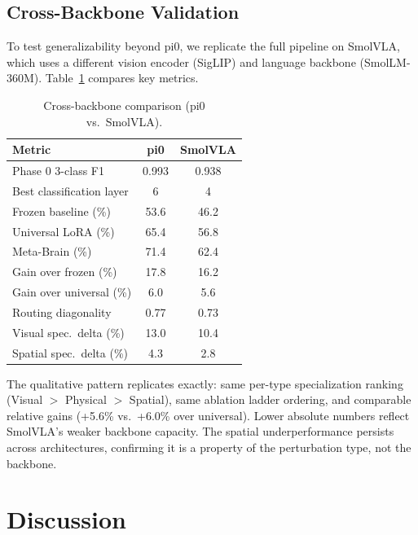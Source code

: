 \documentclass[letterpaper]{article}
\begin{document}
\subsection{Cross-Backbone Validation}

To test generalizability beyond pi0, we replicate the full pipeline on SmolVLA, which uses a different vision encoder (SigLIP) and language backbone (SmolLM-360M).
Table~\ref{tab:cross-backbone} compares key metrics.

\begin{table}[h]
\centering
\caption{Cross-backbone comparison (pi0 vs.\ SmolVLA).}
\label{tab:cross-backbone}
\small
\begin{tabular}{lcc}
\toprule
Metric & pi0 & SmolVLA \\
\midrule
Phase 0 3-class F1          & 0.993 & 0.938 \\
Best classification layer   & 6     & 4 \\
Frozen baseline (\%)        & 53.6  & 46.2 \\
Universal LoRA (\%)         & 65.4  & 56.8 \\
Meta-Brain (\%)             & 71.4  & 62.4 \\
Gain over frozen (\%)       & 17.8  & 16.2 \\
Gain over universal (\%)    & 6.0   & 5.6 \\
Routing diagonality         & 0.77  & 0.73 \\
Visual spec.\ delta (\%)   & 13.0  & 10.4 \\
Spatial spec.\ delta (\%)  & 4.3   & 2.8 \\
\bottomrule
\end{tabular}
\end{table}

The qualitative pattern replicates exactly: same per-type specialization ranking (Visual $>$ Physical $>$ Spatial), same ablation ladder ordering, and comparable relative gains (+5.6\% vs.\ +6.0\% over universal).
Lower absolute numbers reflect SmolVLA's weaker backbone capacity.
The spatial underperformance persists across architectures, confirming it is a property of the perturbation type, not the backbone.

\section{Discussion}
\end{document}
